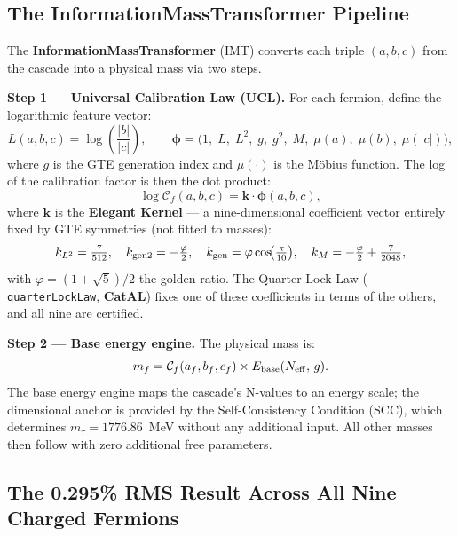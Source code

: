 \documentclass[11pt,a4paper]{article}
\newcommand{\term}[1]{\textbf{#1}}
\newcommand{\lean}[1]{%
  \penalty-100
  \begingroup\def\_{\textunderscore\allowbreak}\texttt{#1}\endgroup}
\newcommand{\CatAL}{\textbf{CatAL}}
\begin{document}
\subsection{The InformationMassTransformer Pipeline}

The \term{InformationMassTransformer} (IMT) converts each triple $(a,b,c)$ from
the cascade into a physical mass via two steps.

\textbf{Step 1 — Universal Calibration Law (UCL).}  For each fermion,
define the logarithmic feature vector:
\begin{equation}
  L(a,b,c) = \log\!\left(\frac{|b|}{|c|}\right), \qquad
  \boldsymbol{\phi} = \bigl(1,\; L,\; L^2,\; g,\; g^2,\; M,\;
    \mu(a),\; \mu(b),\; \mu(|c|)\bigr),
\end{equation}
where $g$ is the GTE generation index and $\mu(\cdot)$ is the Möbius function.
The log of the calibration factor is then the dot product:
\begin{equation}
  \log \mathcal{C}_f(a,b,c) = \mathbf{k} \cdot \boldsymbol{\phi}(a,b,c),
\end{equation}
where $\mathbf{k}$ is the \term{Elegant Kernel} — a nine-dimensional coefficient
vector entirely fixed by GTE symmetries (not fitted to masses):
\begin{equation}
  k_{L^2} = \tfrac{7}{512}, \quad
  k_{\rm gen2} = -\tfrac{\varphi}{2}, \quad
  k_{\rm gen} = \varphi\cos\!\bigl(\tfrac{\pi}{10}\bigr), \quad
  k_M = -\tfrac{\varphi}{2} + \tfrac{7}{2048},
\end{equation}
with $\varphi = (1+\sqrt{5})/2$ the golden ratio.  The Quarter-Lock Law
(\lean{quarterLockLaw}, \CatAL) fixes one of these coefficients in terms of the others, and all nine are certified.

\textbf{Step 2 — Base energy engine.}  The physical mass is:
\begin{equation}
  m_f = \mathcal{C}_f(a_f, b_f, c_f) \times E_{\rm base}(N_{\rm eff},\, g).
\end{equation}
The base energy engine maps the cascade's N-values to an energy scale; the
dimensional anchor is provided by the Self-Consistency Condition (SCC), which
determines $m_\tau = 1776.86$~MeV without any additional input.  All other
masses then follow with zero additional free parameters.

\subsection{The 0.295\% RMS Result Across All Nine Charged Fermions}
\end{document}
